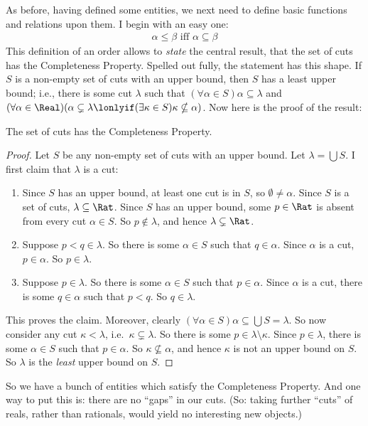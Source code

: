 \documentclass[../../../include/open-logic-section]{subfiles}
\begin{document}
As before, having defined some entities, we next need to define basic functions and relations upon them. I begin with an easy one:
\begin{align*}
	\alpha \leq \beta \text{ iff }\alpha \subseteq \beta
\end{align*}
This definition of an order allows to \emph{state} the central result, that the set of cuts has the Completeness Property. Spelled out fully, the statement has this shape. If $S$ is a non-empty set of cuts with an upper bound, then $S$ has a least upper bound; i.e., there is some cut $\lambda$ such that $(\forall \alpha \in S)\alpha \subseteq \lambda$ and $(\forall \alpha \in \Real)(\alpha \subsetneq \lambda \lonlyif (\exists \kappa \in S)\kappa \nsubseteq \alpha)$. Now here is the proof of the result:
\begin{thm}
	The set of cuts has the Completeness Property. 
	\begin{proof}
		Let $S$ be any non-empty set of cuts with an upper bound. Let $\lambda = \bigcup S$. 
		I first claim that $\lambda$ is a cut:
		\begin{enumerate}
			\item Since $S$ has an upper bound, at least one cut is in $S$, so $\emptyset \neq \alpha$. Since $S$ is a set of cuts, $\lambda \subseteq \Rat$. Since $S$ has an upper bound, some $p \in \Rat$ is absent from every cut $\alpha \in S$. So $p\notin \lambda$, and hence $\lambda \subsetneq \Rat$.
			\item Suppose $p < q \in \lambda$. So there is some $\alpha \in S$ such that $q \in \alpha$. Since $\alpha$ is a cut, $p \in \alpha$. So $p \in \lambda$.
			\item Suppose $p \in \lambda$. So there is some $\alpha \in S$ such that $p \in \alpha$. Since $\alpha$ is a cut, there is some $q \in \alpha$ such that $p < q$. So $q \in \lambda$. 
		\end{enumerate}
		This proves the claim. Moreover, clearly $(\forall \alpha \in S)\alpha \subseteq \bigcup S = \lambda$. So now consider any cut $\kappa < \lambda$, i.e.\ $\kappa \subsetneq \lambda$. So there is some $p \in \lambda \setminus \kappa$. Since $p \in \lambda$, there is some $\alpha \in S$ such that $p \in \alpha$. So $\kappa \nsubseteq \alpha$, and hence $\kappa$ is not an upper bound on $S$. So $\lambda$ is the \emph{least} upper bound on $S$.
	\end{proof}
\end{thm}\noindent
So we have a bunch of entities which satisfy the Completeness Property. And one way to put this is: there are no ``gaps'' in our cuts. (So: taking further ``cuts'' of reals, rather than rationals, would yield no interesting new objects.)
\end{document}
